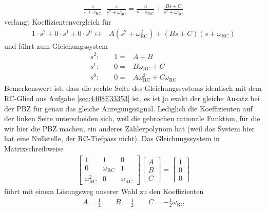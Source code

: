 \begin{Loesung}
\begin{align}
\frac{s}{s + \omega_\text{RC}} \cdot \frac{s}{s^2+\omega_\text{RC}^2} =
\frac{A}{s + \omega_\text{RC}} + \frac{Bs+C}{s^2+\omega_\text{RC}^2}
\end{align}
verlangt Koeffizientenvergleich für
\begin{align}
1 \cdot s^2 + 0 \cdot s^1 + 0 \cdot s^0 \leftrightarrow & A (s^2+\omega_\mathrm{RC}^2) + (B s + C) (s+\omega_\mathrm{RC})
\end{align}
und führt zum Gleichungssystem
\begin{align}
s^2: \qquad 1 =& A + B\\
s^1: \qquad 0 =& B \omega_\mathrm{RC} + C\\
s^0: \qquad 0 =& A \omega_\mathrm{RC}^2 + C \omega_\mathrm{RC}
\end{align}
Bemerkenswert ist, dass die rechte Seite des Gleichungssystems identisch mit dem RC-Glied aus Aufgabe \ref{sec:4408E33353} ist, es ist ja exakt der gleiche Ansatz bei der PBZ für genau das gleiche Anregungssignal. Lediglich die Koeffizienten auf der linken Seite unterscheiden sich, weil die gebrochen rationale Funktion, für die wir hier die PBZ machen, ein anderes Zählerpolynom hat (weil das System hier hat eine Nullstelle, der RC-Tiefpass nicht).
%
Das Gleichungssystem in Matrixschreibweise
\begin{align}
\begin{bmatrix}
1 & 1 & 0\\
0 & \omega_\mathrm{RC} & 1\\
\omega_\mathrm{RC}^2 & 0 & \omega_\mathrm{RC}
\end{bmatrix}
\begin{bmatrix}
A\\B\\C
\end{bmatrix}
=
\begin{bmatrix}
1\\0\\0
\end{bmatrix}
\end{align}
führt mit einem Lösungsweg unserer Wahl zu den Koeffizienten
\begin{align}
A = \frac{1}{2}\qquad B = \frac{1}{2}\qquad C = -\frac{1}{2} \omega_\mathrm{RC}
\end{align}

\end{Loesung}
